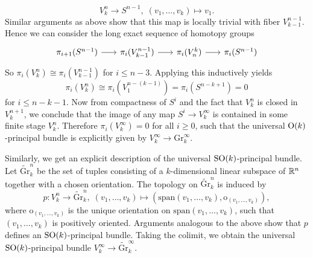 \begin{example}
\begin{enumerate}[label=(\roman*)]
        \[
        V_k^n \to S^{n-1}, \; (v_1, \ldots, v_k) \mapsto v_1.
        \]
        Similar arguments as above show that this map is locally trivial with fiber $V_{k-1}^{n-1}$. Hence we can consider the long exact sequence of homotopy groups 
        \[\begin{tikzcd}[column sep=scriptsize]
        {\pi_{i+1}(S^{n-1})} & {\pi_i(V_{k-1}^{n-1})} & {\pi_i(V_n^k)} & {\pi_i(S^{n-1})}
        \arrow[from=1-1, to=1-2]
        \arrow[from=1-2, to=1-3]
        \arrow[from=1-3, to=1-4]
        \end{tikzcd}\]
        So $\pi_i(V_k^n) \cong \pi_i(V_{k-1}^{n-1})$ for $i \leq n-3$. Applying this inductively yields 
        \[
        \pi_i(V_k^n) \cong \pi_i(V_1^{n-(k-1)}) = \pi_i(S^{n-k+1}) = 0
        \] 
        for $i \leq n-k-1$. Now from compactness of $S^i$ and the fact that $V_k^n$ is closed in $V_k^{n+1}$, we conclude that the image of any map $S^i \to V_k^\infty$ is contained in some finite stage $V_k^n$. Therefore $\pi_i(V_k^\infty) = 0$ for all $i \geq 0$, such that the universal $\mathrm{O}(k)$-principal bundle is explicitly given by $V_k^\infty \to \mathrm{Gr}_k^\infty$.

        Similarly, we get an explicit description of the universal $\mathrm{SO}(k)$-principal bundle. Let $\tilde{\mathrm{Gr}}_k^n$ be the set of tuples consisting of a $k$-dimensional linear subspace of $\mathbb{R}^n$ together with a chosen orientation. The topology on $\tilde{\mathrm{Gr}}_k^n$ is induced by 
        \[
        p \colon V_k^n \to \tilde{\mathrm{Gr}}_k^n, \; (v_1,\ldots,v_k) \mapsto (\mathrm{span}(v_1,\ldots,v_k), \mathrm{o}_{(v_1,\ldots,v_k)}),
        \] 
        where $\mathrm{o}_{(v_1,\ldots,v_k)}$ is the unique orientation on $\mathrm{span}(v_1,\ldots,v_k)$, such that $(v_1,\ldots,v_k)$ is positively oriented. Arguments analogous to the above show that $p$ defines an $\mathrm{SO}(k)$-principal bundle. Taking the colimit, we obtain the universal $\mathrm{SO}(k)$-principal bundle $V_k^\infty \to \tilde{\mathrm{Gr}}_k^\infty$.


\end{enumerate}
\end{example}
